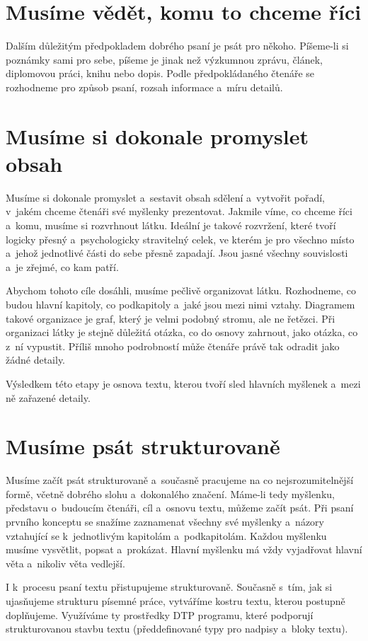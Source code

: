 \section{Musíme vědět, komu to chceme říci}
Dalším důležitým předpokladem dobrého psaní je psát pro někoho. Píšeme-li si poznámky sami pro sebe, píšeme je jinak než výzkumnou zprávu, článek, diplomovou práci, knihu nebo dopis. Podle předpokládaného čtenáře se rozhodneme pro způsob psaní, rozsah informace a~míru detailů.

\section{Musíme si dokonale promyslet obsah}
Musíme si dokonale promyslet a~sestavit obsah sdělení a~vytvořit pořadí, v~jakém chceme čtenáři své myšlenky prezentovat. 
Jakmile víme, co chceme říci a~komu, musíme si rozvrhnout látku. Ideální je takové rozvržení, které tvoří logicky přesný a~psychologicky stravitelný celek, ve kterém je pro všechno místo a~jehož jednotlivé části do sebe přesně zapadají. Jsou jasné všechny souvislosti a~je zřejmé, co kam patří.

Abychom tohoto cíle dosáhli, musíme pečlivě organizovat látku. Rozhodneme, co budou hlavní kapitoly, co podkapitoly a~jaké jsou mezi nimi vztahy. Diagramem takové organizace je graf, který je velmi podobný stromu, ale ne řetězci. Při organizaci látky je stejně důležitá otázka, co do osnovy zahrnout, jako otázka, co z~ní vypustit. Příliš mnoho podrobností může čtenáře právě tak odradit jako žádné detaily.

Výsledkem této etapy je osnova textu, kterou tvoří sled hlavních myšlenek a~mezi ně zařazené detaily.

\section{Musíme psát strukturovaně} 
Musíme začít psát strukturovaně a~současně pracujeme na co nejsrozumitelnější formě, včetně dobrého slohu a~dokonalého značení. 
Máme-li tedy myšlenku, představu o~budoucím čtenáři, cíl a~osnovu textu, můžeme začít psát. Při psaní prvního konceptu se snažíme zaznamenat všechny své myšlenky a~názory vztahující se k~jednotlivým kapitolám a~podkapitolám. Každou myšlenku musíme vysvětlit, popsat a~prokázat. Hlavní myšlenku má vždy vyjadřovat hlavní věta a~nikoliv věta vedlejší.

I k~procesu psaní textu přistupujeme strukturovaně. Současně s~tím, jak si ujasňujeme strukturu písemné práce, vytváříme kostru textu, kterou postupně doplňujeme. Využíváme ty prostředky DTP programu, které podporují strukturovanou stavbu textu (předdefinované typy pro nadpisy a~bloky textu). 


